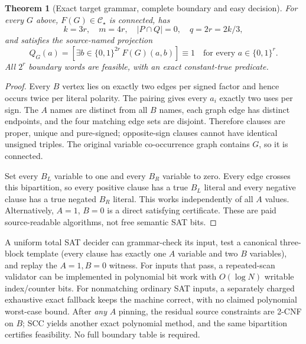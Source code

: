 \documentclass[11pt]{article}
\newtheorem{theorem}{Theorem}
\newcommand{\CS}{\mathcal C_\star}
\begin{document}
\begin{theorem}[Exact target grammar, complete boundary and easy decision]
For every $G$ above, $F(G)\in\CS$ is connected, has
\[
k=3r,\quad m=4r,\quad |P\cap Q|=0,\quad q=2r=2k/3,
\]
and satisfies the source-named projection
\[
Q_G(a)=\left[\exists b\in\{0,1\}^{2r}\,F(G)(a,b)\right]\equiv1
\quad\text{for every }a\in\{0,1\}^r.
\]
All $2^r$ boundary words are feasible, with an exact constant-true predicate.
\end{theorem}
\begin{proof}
Every $B$ vertex lies on exactly two edges per signed factor and hence occurs twice per literal polarity. The pairing gives every $a_i$ exactly two uses per sign. The $A$ names are distinct from all $B$ names, each graph edge has distinct endpoints, and the four matching edge sets are disjoint. Therefore clauses are proper, unique and pure-signed; opposite-sign clauses cannot have identical unsigned triples. The original variable co-occurrence graph contains $G$, so it is connected.

Set every $B_L$ variable to one and every $B_R$ variable to zero. Every edge crosses this bipartition, so every positive clause has a true $B_L$ literal and every negative clause has a true negated $B_R$ literal. This works independently of all $A$ values. Alternatively, $A=1$, $B=0$ is a direct satisfying certificate. These are paid source-readable algorithms, not free semantic SAT bits.
\end{proof}

A uniform total SAT decider can grammar-check its input, test a canonical three-block template (every clause has exactly one $A$ variable and two $B$ variables), and replay the $A=1,B=0$ witness. For inputs that pass, a repeated-scan validator can be implemented in polynomial bit work with $O(\log N)$ writable index/counter bits. For nonmatching ordinary SAT inputs, a separately charged exhaustive exact fallback keeps the machine correct, with no claimed polynomial worst-case bound. After \emph{any} $A$ pinning, the residual source constraints are 2-CNF on $B$; SCC yields another exact polynomial method, and the same bipartition certifies feasibility. No full boundary table is required.
\end{document}
